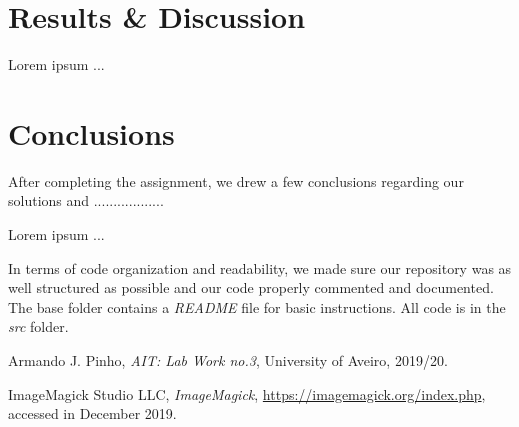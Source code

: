 \documentclass[12pt]{article}
\begin{document}
\section{Results \& Discussion} %
Lorem ipsum ...


\section{Conclusions} %

After completing the assignment, we drew a few conclusions regarding our 
solutions and ..................

Lorem ipsum ...

In terms of code organization and readability, we made sure our 
repository was as well structured as possible and our code properly commented
and documented.
The base folder contains a {\it README\/} file for basic instructions.
All code is in the {\it src\/} folder.

\newpage
\begin{thebibliography}{9} %
  

    Armando J. Pinho,
    \textit{AIT: Lab Work no.3},
    University of Aveiro,
    2019/20.
  
    ImageMagick Studio LLC,
    \textit{ImageMagick},
    \url{https://imagemagick.org/index.php},
    accessed in December 2019.
  
\end{thebibliography}

\clearpage
\end{document}
